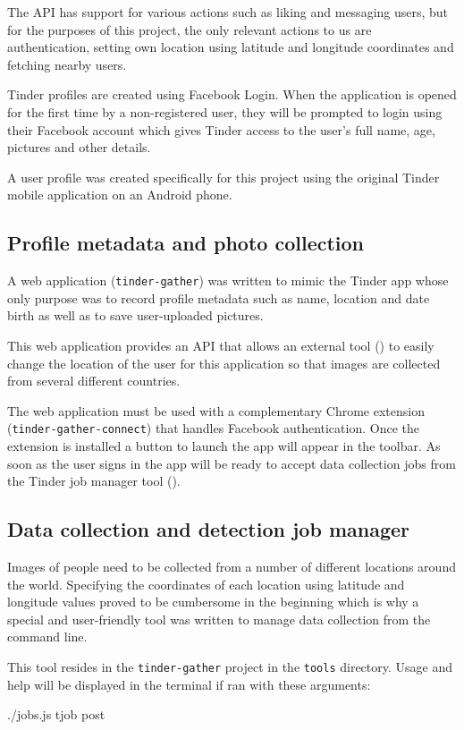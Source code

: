 The API has support for various actions such as liking and messaging users, 
but for the purposes of this project, the only relevant actions to us are 
authentication, setting own location using latitude and longitude coordinates 
and fetching nearby users.

Tinder profiles are created using Facebook Login. When the application is 
opened for the first time by a non-registered user, they will be prompted to 
login using their Facebook account which gives Tinder access to the user's full name, 
age, pictures and other details.

A user profile was created specifically for this project using the original 
Tinder mobile application on an Android phone. 

\subsection{Profile metadata and photo collection}
A web application (\texttt{tinder-gather}) was written to mimic the Tinder app
whose only purpose was to record profile metadata such as name, location and
date birth as well as to save user-uploaded pictures. 

This web application provides an API that allows an external tool 
() to easily change the location of the user for this 
application so that images are collected from several different 
countries.

The web application must be used with a complementary Chrome extension 
(\texttt{tinder-gather-connect}) that handles Facebook authentication.
Once the extension is installed a button to launch the app will appear in the 
toolbar. As soon as the user signs in the app will be ready to accept data 
collection jobs from the Tinder job manager tool ().

\subsection{Data collection and detection job manager}
\label{spec:data:jobs}
Images of people need to be collected from a number of different locations 
around the world. Specifying the coordinates of each location using latitude 
and longitude values proved to be cumbersome in the beginning which is why a 
special and user-friendly tool was written to manage data collection from the 
command line.

This tool resides in the \texttt{tinder-gather} project in the \texttt{tools} 
directory. Usage and help will be displayed in the terminal if ran with these 
arguments:
\begin{logs}
./jobs.js tjob post
\end{logs}

